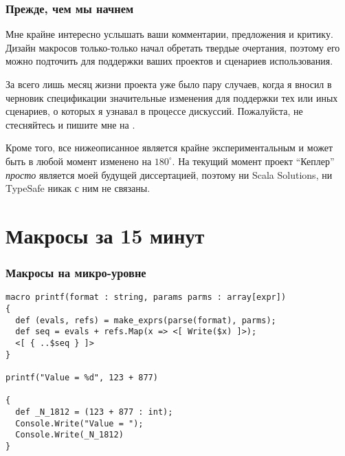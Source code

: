 \documentclass{beamer}
\begin{document}
\begin{frame}[t]
\frametitle{Прежде, чем мы начнем}

Мне крайне интересно услышать ваши комментарии, предложения и критику. Дизайн макросов только-только начал обретать твердые очертания, поэтому его можно подточить для поддержки ваших проектов и сценариев использования.

За всего лишь месяц жизни проекта уже было пару случаев, когда я вносил в черновик спецификации значительные изменения для поддержки тех или иных сценариев, о которых я узнавал в процессе дискуссий. Пожалуйста, не стесняйтесь и пишите мне на .

Кроме того, все нижеописанное является крайне экспериментальным и может быть в любой момент изменено на $180^{\circ}$. На текущий момент проект ``Кеплер'' \emph{просто} является моей будущей диссертацией, поэтому ни Scala Solutions, ни TypeSafe никак с ним не связаны.
\end{frame}

\section{Макросы за 15 минут}

\begin{frame}[t, fragile]
\frametitle{Макросы на микро-уровне}

\begin{lstlisting}[language=nemerle]
macro printf(format : string, params parms : array[expr]) 
{ 
  def (evals, refs) = make_exprs(parse(format), parms); 
  def seq = evals + refs.Map(x => <[ Write($x) ]>); 
  <[ { ..$seq } ]> 
} 
 
printf("Value = %d", 123 + 877) 
 
{ 
  def _N_1812 = (123 + 877 : int); 
  Console.Write("Value = "); 
  Console.Write(_N_1812) 
} 
\end{lstlisting}

\end{frame}
\end{document}
